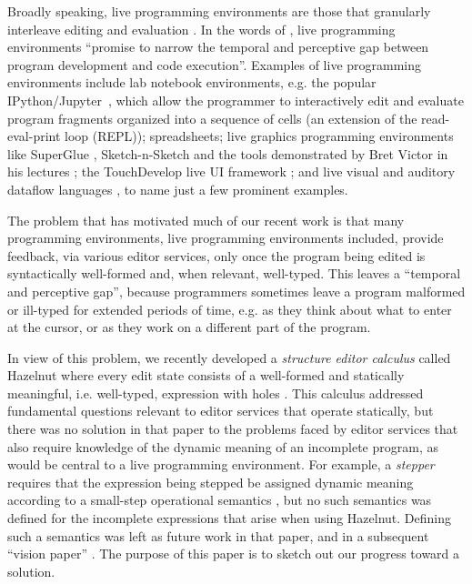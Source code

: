 
Broadly speaking, live programming environments are those that granularly interleave editing and evaluation \cite{DBLP:conf/icse/Tanimoto13,DBLP:journals/vlc/Tanimoto90,McDirmid:2007:LUL:1297027.1297073,burckhardt2013s}. 
In the words of \citet{burckhardt2013s}, live programming environments 
``promise to narrow the temporal and perceptive gap 
between program development and code execution''. Examples of live programming environments include {lab notebook environments},
e.g. the popular IPython/Jupyter~\cite{PER-GRA:2007}, which allow the
programmer to interactively edit and evaluate program fragments organized into a
sequence of cells (an extension of the read-eval-print loop (REPL)); spreadsheets; {live graphics programming environments} like SuperGlue \cite{McDirmid:2007:LUL:1297027.1297073}, Sketch-n-Sketch \cite{DBLP:conf/pldi/ChughHSA16} and the tools demonstrated by Bret Victor in his lectures \cite{victor2012inventing}; the TouchDevelop live UI framework \cite{Burckhardt:2013:ACF:2491956.2462170}; and live visual and auditory dataflow languages \cite{DBLP:conf/vl/BurnettAW98}, to name just a few prominent examples.


The problem that has motivated much of our recent work is that many  
programming environments, live programming environments included,  provide feedback, via various editor services, only once the program being edited is syntactically well-formed and, when relevant, well-typed. This leaves a ``temporal and perceptive gap'', because programmers sometimes leave a program malformed or ill-typed for extended periods of time, e.g. as they think about what to enter at the cursor, or as they work on a different part of the program.

In view of this problem, we recently developed a \emph{structure editor calculus} called Hazelnut where every edit state consists of a well-formed and statically meaningful, i.e. well-typed, expression with holes \cite{popl-paper}. This calculus addressed fundamental questions relevant to editor services that operate statically, but there was no solution in that paper to the problems faced by editor services that also require knowledge of the dynamic meaning of an incomplete program, as would be central to a live programming environment. For example, a \emph{stepper} requires that the expression being stepped be assigned dynamic meaning according to a small-step operational semantics \cite{DBLP:journals/jlp/Plotkin04a,pfpl}, but no such semantics was defined for the incomplete expressions that arise when using Hazelnut. Defining such a semantics was left as future work in that paper, and in a subsequent ``vision paper'' \cite{snapl17-paper}. The purpose of this paper is to sketch out our progress toward a solution.

